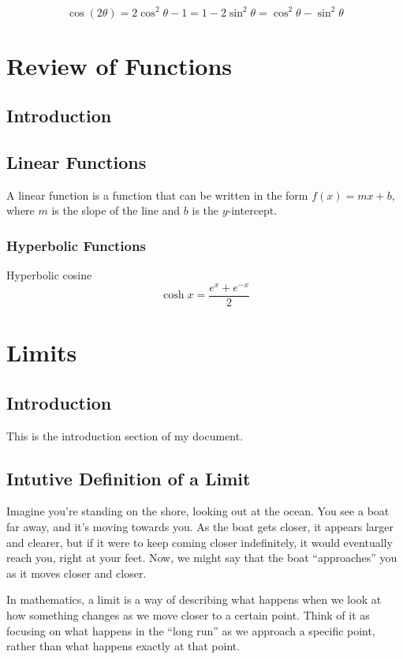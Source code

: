 \documentclass[12pt]{book}
\begin{document}
\begin{equation} 
	\cos (2\theta) = 2\cos^2 \theta -1 =1-2\sin^2 \theta = \cos ^2 \theta - \sin^2 \theta
\end{equation}



\chapter{Review of Functions}
\section{Introduction}


\section{Linear Functions}
A linear function is a function that can be written in the form $f(x) = mx + b$, where $m$ is the slope of the line and $b$ is the $y$-intercept.

\subsection{Hyperbolic Functions}

Hyperbolic cosine 
\begin{equation}
	\cosh x = \frac{e^x + e^{-x}}{2}
\end{equation}

\chapter{Limits}
\section{Introduction}
This is the introduction section of my document.
\section{Intutive Definition of a Limit}
Imagine you’re standing on the shore, looking out at the ocean. You see a boat far away, and it’s moving towards you. As the boat gets closer, it appears larger and clearer, but if it were to keep coming closer indefinitely, it would eventually reach you, right at your feet. Now, we might say that the boat “approaches” you as it moves closer and closer.

In mathematics, a limit is a way of describing what happens when we look at how something changes as we move closer to a certain point. Think of it as focusing on what happens in the “long run” as we approach a specific point, rather than what happens exactly at that point.
\end{document}
